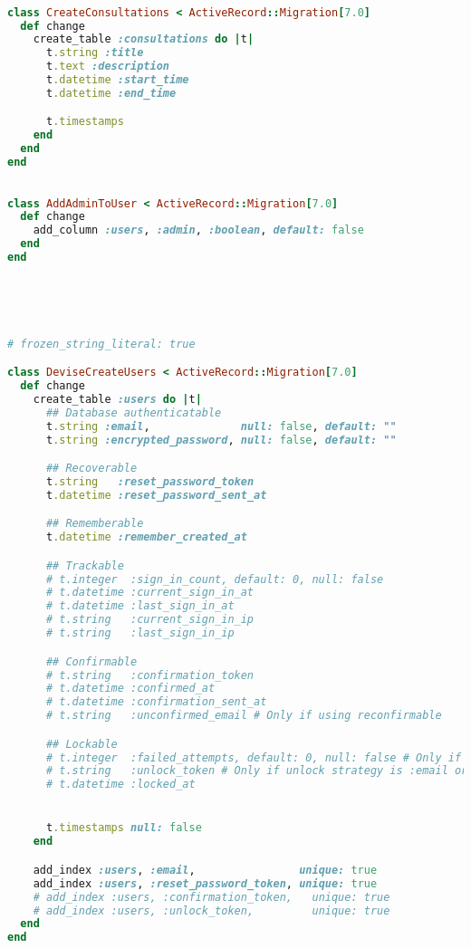 \begin{lstlisting}[language=Ruby, caption=CreateConsultations]

class CreateConsultations < ActiveRecord::Migration[7.0]
  def change
    create_table :consultations do |t|
      t.string :title
      t.text :description
      t.datetime :start_time
      t.datetime :end_time

      t.timestamps
    end
  end
end



\end{lstlisting}

\begin{lstlisting}[language=Ruby, caption=AddAdminToUser]
class AddAdminToUser < ActiveRecord::Migration[7.0]
  def change
    add_column :users, :admin, :boolean, default: false
  end
end





\end{lstlisting}

\begin{lstlisting}[language=Ruby, caption=DeviseCreateUsers]

# frozen_string_literal: true

class DeviseCreateUsers < ActiveRecord::Migration[7.0]
  def change
    create_table :users do |t|
      ## Database authenticatable
      t.string :email,              null: false, default: ""
      t.string :encrypted_password, null: false, default: ""

      ## Recoverable
      t.string   :reset_password_token
      t.datetime :reset_password_sent_at

      ## Rememberable
      t.datetime :remember_created_at

      ## Trackable
      # t.integer  :sign_in_count, default: 0, null: false
      # t.datetime :current_sign_in_at
      # t.datetime :last_sign_in_at
      # t.string   :current_sign_in_ip
      # t.string   :last_sign_in_ip

      ## Confirmable
      # t.string   :confirmation_token
      # t.datetime :confirmed_at
      # t.datetime :confirmation_sent_at
      # t.string   :unconfirmed_email # Only if using reconfirmable

      ## Lockable
      # t.integer  :failed_attempts, default: 0, null: false # Only if lock strategy is :failed_attempts
      # t.string   :unlock_token # Only if unlock strategy is :email or :both
      # t.datetime :locked_at


      t.timestamps null: false
    end

    add_index :users, :email,                unique: true
    add_index :users, :reset_password_token, unique: true
    # add_index :users, :confirmation_token,   unique: true
    # add_index :users, :unlock_token,         unique: true
  end
end





\end{lstlisting}

